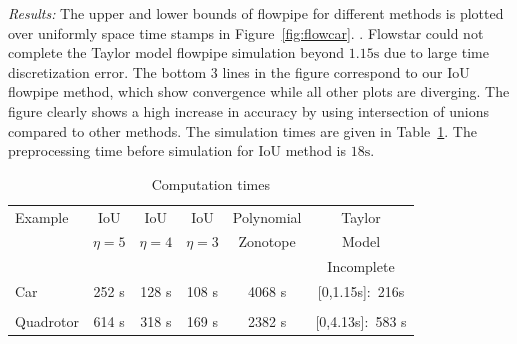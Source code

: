 \emph{Results:}  The upper and lower bounds of flowpipe for different
  methods is plotted over uniformly space time stamps in
  Figure~\ref{fig:flowcar}.  
  .
  Flowstar could not complete the Taylor
  model flowpipe simulation beyond $1.15\si{\second}$ due to large
  time discretization error.  The bottom 3 lines in the figure
  correspond to our IoU flowpipe method, which show convergence while
  all other plots are diverging.  The figure clearly shows a high
  increase in accuracy by using intersection of unions compared to
  other methods.  The simulation times are given in
  Table~\ref{tab:comptimes}.  The preprocessing time before simulation
  for IoU method is $18\si{\second}$.
\begin{table}
\begin{center}
\caption{Computation times}\label{tab:comptimes}
\begin{tabular}{|l|c|c|c|c|c|}
\hline
Example & IoU  & IoU  & IoU  &
Polynomial & Taylor\\
& $\eta = 5$ & $\eta = 4$ & $\eta = 3$ & Zonotope & Model \\
\hline
& & & & & {\color{red}Incomplete}\\
Car & 252 s & 128 s & 108 s & 4068 s& {\color{red}[0,1.15s]:~216s}\\
\hline
& & & & &\\
Quadrotor & 614 s & 318 s & 169 s & 2382 s &
{\color{red}[0,4.13s]:~583 s} \\
\hline
\end{tabular}
\end{center}
\end{table}
%
